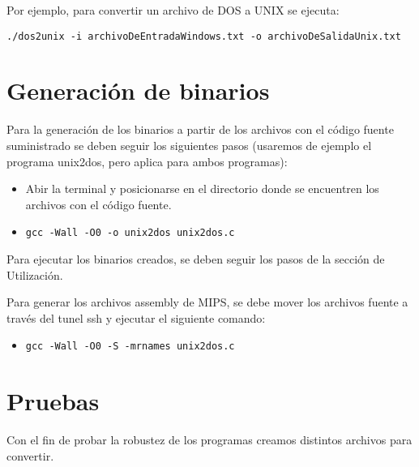 \documentclass[a4paper,11pt]{article}
\begin{document}
\indent	
Por ejemplo, para convertir un archivo de DOS a UNIX se ejecuta: 

\begin{verbatim}
./dos2unix -i archivoDeEntradaWindows.txt -o archivoDeSalidaUnix.txt
\end{verbatim}

\section{Generaci\'on de binarios}
Para la generaci\'on de los binarios a partir de los archivos con el c\'odigo fuente suministrado se deben seguir los siguientes pasos (usaremos de ejemplo el programa unix2dos, pero aplica para ambos programas):

\begin{itemize}
\item Abir la terminal y posicionarse en el directorio donde se encuentren los archivos con el c\'odigo fuente.
\item \begin{verbatim}
gcc -Wall -O0 -o unix2dos unix2dos.c
\end{verbatim} 
\end{itemize}

Para ejecutar los binarios creados, se deben seguir los pasos de la secci\'on de Utilizaci\'on.

Para generar los archivos assembly de MIPS, se debe mover los archivos fuente a trav\'es del tunel ssh y ejecutar el siguiente comando:
\begin{itemize}
\item \begin{verbatim}
gcc -Wall -O0 -S -mrnames unix2dos.c
\end{verbatim}
\end{itemize}

\section{Pruebas}
Con el fin de probar la robustez de los programas creamos distintos archivos para convertir.
\end{document}
